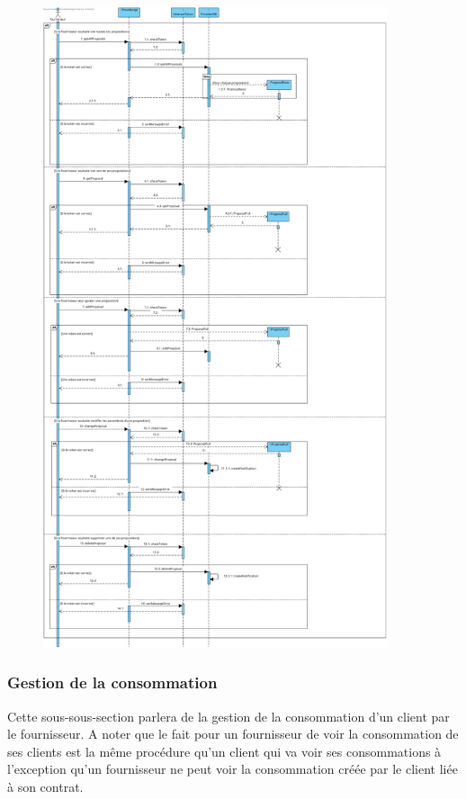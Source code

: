 \newpage
\begin{figure}[h]
    \centering
    \includegraphics[width = 0.9\textwidth]{Base/sequence/img/fournisseur/voir les propositions.png}
\end{figure}

\newpage
\subsubsection{Gestion de la consommation}
\begin{flushleft}
Cette sous-sous-section parlera de la gestion de la consommation d'un client par le fournisseur. A noter que le fait pour un fournisseur de voir la consommation de ses clients est la même procédure qu'un client qui va voir ses consommations à l'exception qu'un fournisseur ne peut voir la consommation créée par le client liée à son contrat.     
\end{flushleft}

